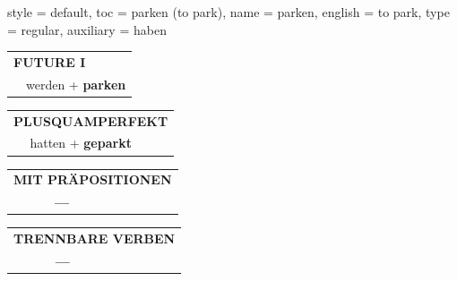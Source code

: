 \begin{verbentry}{
  style = {default},
  toc = {parken (to park)},
  name = {parken},
  english = {to park},
  type = {regular},
  auxiliary = {haben}
}
\begin{tabular}{rl}
    \multicolumn{2}{l}{\textbf{FUTURE I} }\\
  &  werden + \textbf{parken}\\
 
  \end{tabular}
\hfill
   \begin{tabular}{rl}
      \multicolumn{2}{l}{\textbf{PLUSQUAMPERFEKT}}\\
   & hatten + \textbf{geparkt}\\
  \end{tabular}
  
  \vspace{10pt}

\begin{tabular}{lll}
\multicolumn{3}{l}{\textbf{MIT PRÄPOSITIONEN}}\\
& \textbf{---} & \\
\end{tabular}
\hfill
\begin{tabular}{lll}
\multicolumn{3}{l}{\textbf{TRENNBARE VERBEN}}\\
& \textbf{---} & \\
\end{tabular}
\end{verbentry}


